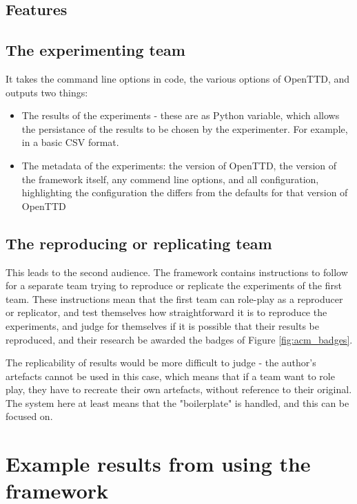 \documentclass[logo,msc]{infthesis}           %
\begin{document}
\section{Features}

\section{The experimenting team}

It takes the command line options in code, the various options of OpenTTD, and outputs two things:

\begin{itemize}
\item The results of the experiments - these are as Python variable, which allows the persistance of the results to be chosen by the experimenter. For example, in a basic CSV format.
\item The metadata of the experiments: the version of OpenTTD, the version of the framework itself, any commend line options, and all configuration, highlighting the configuration the differs from the defaults for that version of OpenTTD
\end{itemize}

\section{The reproducing or replicating team}

This leads to the second audience. The framework contains instructions to follow for a separate team trying to reproduce or replicate the experiments of the first team. These instructions mean that the first team can role-play as a reproducer or replicator, and test themselves how straightforward it is to reproduce the experiments, and judge for themselves if it is possible that their results be reproduced, and their research be awarded the badges of Figure \ref{fig:acm_badges}.

The replicability of results would be more difficult to judge - the author's artefacts cannot be used in this case, which means that if a team want to role play, they have to recreate their own artefacts, without reference to their original. The system here at least means that the "boilerplate" is handled, and this can be focused on.

\chapter{Example results from using the framework}
\end{document}
